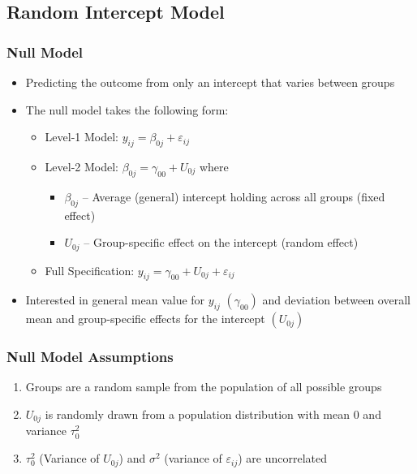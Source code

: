 \documentclass{beamer}
\begin{document}
\subsection{Random Intercept Model}

\begin{frame}
	\frametitle{Null Model}
		\begin{itemize}
			\item Predicting the outcome from only an intercept that varies between groups
			\item The null model takes the following form:
				\begin{itemize}
					\item Level-1 Model: $y_{ij}=\beta_{0j}+\varepsilon_{ij}$
					\item Level-2 Model: $\beta_{0j}=\gamma_{00}+U_{0j}$ where
						\begin{itemize}
							\item $\beta_{0j}$ -- Average (general) intercept holding across all groups (fixed effect)
							\item $U_{0j}$ -- Group-specific effect on the intercept (random effect)
						\end{itemize}
					\item Full Specification: $y_{ij}=\gamma_{00}+U_{0j}+\varepsilon_{ij}$
				\end{itemize}
			\item Interested in general mean value for $y_{ij}$ $(\gamma_{00})$ and deviation between overall mean and group-specific effects for the intercept $(U_{0j})$
		\end{itemize}
\end{frame}

\begin{frame}
	\frametitle{Null Model Assumptions}
		\begin{enumerate}
			\item Groups are a random sample from the population of all possible groups
			\item $U_{0j}$ is randomly drawn from a population distribution with mean $0$ and variance $\tau^{2}_{0}$
			\item $\tau^{2}_{0}$ (Variance of $U_{0j}$) and $\sigma^2$ (variance of $\varepsilon_{ij}$) are uncorrelated
		\end{enumerate}
\end{frame}
\end{document}

